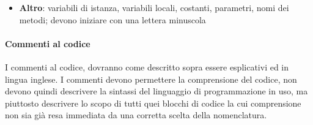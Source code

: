 \documentclass[11pt,a4paper]{article}
\begin{document}
{\begin{itemize}
\begin{multicols}{2}
	\begin{lstlisting}[caption=nome metodo corretto]
	thisIsAnExample();
	\end{lstlisting}

	\begin{lstlisting}[caption=nome metodo scorretto]
 	ThisIsAnExample();
	\end{lstlisting}
\end{multicols}


		\item \textbf{Altro}: variabili di istanza, variabili locali, costanti, parametri, nomi dei metodi; devono iniziare con una lettera minuscola
	\end{itemize}
	
	\paragraph{Commenti al codice}
	I commenti al codice, dovranno come descritto sopra essere esplicativi ed in lingua inglese.
	I commenti devono permettere la comprensione del codice, non
	devono quindi descrivere la sintassi del linguaggio di programmazione in uso, ma piuttosto descrivere lo scopo di tutti quei blocchi di codice la cui comprensione non sia già resa immediata da una corretta scelta della nomenclatura.
	
}
\end{document}
